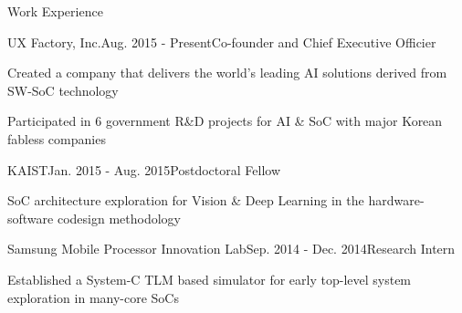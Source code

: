 \documentclass{resume} %
\begin{document}


\makecvheader


\begin{section}{Work Experience}

\begin{subsection}{UX Factory, Inc.}{Aug. 2015 - Present}{Co-founder and Chief Executive Officier}{}
\item Created a company that delivers the world's leading AI solutions derived from SW-SoC technology
\item Participated in 6 government R\&D projects for AI \& SoC with major Korean fabless companies
\end{subsection}

\begin{subsection}{KAIST}{Jan. 2015 - Aug. 2015}{Postdoctoral Fellow}{}
\item SoC architecture exploration for Vision \& Deep Learning in the hardware-software codesign methodology
\end{subsection}

\begin{subsection}{Samsung Mobile Processor Innovation Lab}{Sep. 2014 - Dec. 2014}{Research Intern}{}
\item Established a System-C TLM based simulator for early top-level system exploration  in many-core SoCs
\end{subsection}

\end{section}

\end{document}
